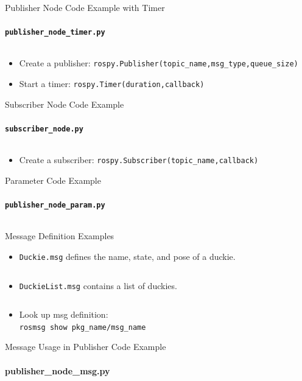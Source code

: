 \documentclass[aspectratio=43]{beamer}
\newcommand{\pyinline}[1]{\texttt{#1}}
\newcommand{\inline}[1]{\texttt{#1}}
\begin{document}
\begin{frame}{Publisher Node Code Example with Timer}
	\framesubtitle{\texttt{publisher\_node\_timer.py}}
	\inputminted{python}{snippet/publisher_node_timer.py}
	\begin{itemize}
	\item Create a publisher: \pyinline{rospy.Publisher(topic_name,msg_type,queue_size)}
	\item Start a timer: \pyinline{rospy.Timer(duration,callback)}
	\end{itemize}
\end{frame}

\begin{frame}{Subscriber Node Code Example}
	\framesubtitle{\texttt{subscriber\_node.py}}
	\inputminted{python}{snippet/subscriber_node.py}
	\begin{itemize}
		\item Create a subscriber: \pyinline{rospy.Subscriber(topic_name,callback)}
	\end{itemize}
\end{frame}

\begin{frame}{Parameter Code Example}
	\framesubtitle{\texttt{publisher\_node\_param.py}}
	\inputminted{python}{snippet/publisher_node_param.py}
\end{frame}

\begin{frame}{Message Definition Examples}
	\begin{itemize}
		\item \texttt{Duckie.msg} defines the name, state, and pose of a duckie.
		\inputminted{python}{snippet/Duckie.msg}
		\item \texttt{DuckieList.msg} contains a list of duckies.
		\inputminted{python}{snippet/DuckieList.msg}
		\item Look up msg definition:\\\inline{rosmsg show pkg_name/msg_name}
	\end{itemize}
\end{frame}

\begin{frame}{Message Usage in Publisher Code Example}
	\framesubtitle{publisher\_node\_msg.py}
	\inputminted{python}{snippet/publisher_node_msg.py}
\end{frame}
\end{document}
